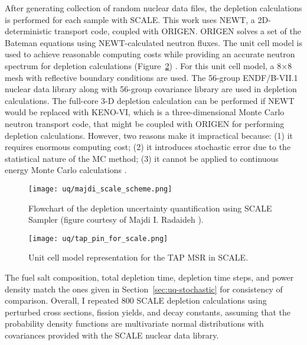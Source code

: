 After generating collection of random nuclear data files, the depletion 
calculations is performed for each sample with SCALE. This work uses NEWT, a
2D-deterministic transport code, coupled with ORIGEN. ORIGEN solves a set of 
the Bateman equations using NEWT-calculated neutron fluxes. The unit cell 
model is used to achieve reasonable computing costs while providing an 
accurate neutron spectrum for depletion calculations 
(Figure~\ref{fig:uq-tap-pincell}) \cite{betzler_molten_2017, 
rykhlevskii_fuel_2019, betzler_modeling_2020}. For this unit cell model, a 
8$\times$8 mesh with reflective boundary conditions are used. The 56-group 
ENDF/B-VII.1 nuclear data library along with 56-group covariance library are 
used in depletion calculations. The full-core 3-D depletion 
calculation can be performed if NEWT would be replaced with KENO-VI, which 
is a three-dimensional Monte Carlo neutron transport code, that might be 
coupled with ORIGEN for performing depletion calculations. However, two 
reasons make it impractical because: 
(1) it requires enormous computing cost; (2) it introduces stochastic error 
due to the statistical nature of the \gls{MC} method;
(3) it cannot be applied to continuous energy Monte Carlo calculations 
\cite{rearden_scale_2018}.
\begin{figure}[htp!] %
	\centering
	\texttt{[image: uq/majdi\_scale\_scheme.png]}
	\caption{Flowchart of the depletion uncertainty quantification 
		using SCALE Sampler (figure courtesy of Majdi I. Radaideh 
		\cite{radaideh_novel_2019-1}).}
	\label{fig:uq-sampler}
\end{figure}
	\vspace{-7mm}
\begin{figure}[hbp!] %
	\centering
	\texttt{[image: uq/tap\_pin\_for\_scale.png]}
	\caption{Unit cell model representation for the \gls{TAP} \gls{MSR} in 
	SCALE.}
	\label{fig:uq-tap-pincell}
\end{figure}

The fuel salt composition, total depletion time, depletion time steps, and 
power density match the ones given in Section~\ref{sec:uq-stochastic} for 
consistency of comparison. Overall, I repeated 800 SCALE depletion 
calculations using perturbed cross sections, fission yields, and decay 
constants, assuming that the probability density functions are multivariate 
normal distributions with covariances provided with the SCALE nuclear data 
library.


